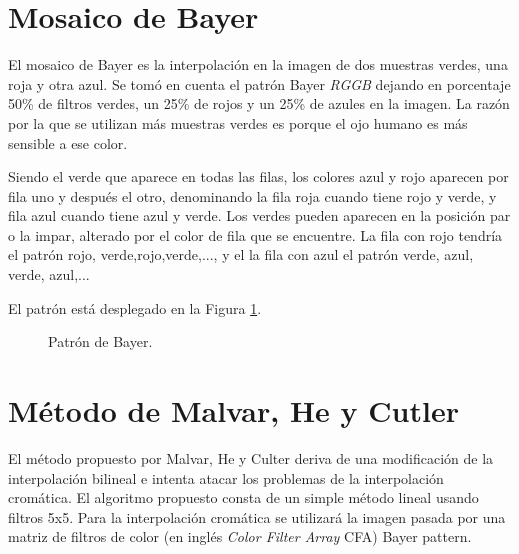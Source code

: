 \cite{extra2}


\section{Mosaico de Bayer\cite{Bayer}}
El mosaico de Bayer es la interpolación en la imagen de dos muestras verdes, una roja y otra azul. Se tomó en cuenta el patrón Bayer \textit{RGGB} dejando en porcentaje 50\% de filtros verdes, un 25\% de rojos y un 25\% de azules en la imagen. La razón por la que se utilizan más muestras verdes es porque el ojo humano es más sensible a ese color.

Siendo el verde que aparece en todas las filas, los colores azul y rojo aparecen por fila uno y después el otro, denominando la fila roja cuando tiene rojo y verde, y fila azul cuando tiene azul y verde. Los verdes pueden aparecen en la posición par o la impar, alterado por el color de fila que se encuentre.
La fila con rojo tendría el patrón rojo, verde,rojo,verde,..., y el la fila con azul el patrón verde, azul, verde, azul,...

El patrón está desplegado en la Figura \ref{fBayer}.

\begin{figure}[h]
  \centering
  \centering
  \caption{Patrón de Bayer.}
  \label{fBayer}
\end{figure}

\section{Método de Malvar, He y Cutler}\label{capMalvar}
El método propuesto por Malvar, He y Culter deriva de una modificación de la interpolación bilineal e intenta atacar los problemas de la interpolación cromática. El algoritmo propuesto consta de un simple método lineal usando filtros 5x5. Para la interpolación cromática se utilizará la imagen pasada por una matriz de filtros de color (en inglés \textit{Color Filter Array} CFA) Bayer pattern\cite{Bayer}.

